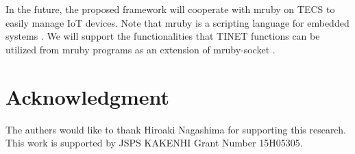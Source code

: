 \documentclass[conference]{IEEEtran/IEEEtran}
\begin{document}
In the future, the proposed framework will cooperate with mruby on TECS \cite{par:mrubyonTECS} to easily manage IoT devices.
Note that mruby is a scripting language for embedded systems \cite{par:mruby}.
We will support the functionalities that TINET functions can be utilized from mruby programs as an extension of mruby-socket \cite{url:mruby-library}.

    


\section*{Acknowledgment}

The authers would like to thank Hiroaki Nagashima for supporting this research.
This work is supported by JSPS KAKENHI Grant Number 15H05305.





\end{document}
